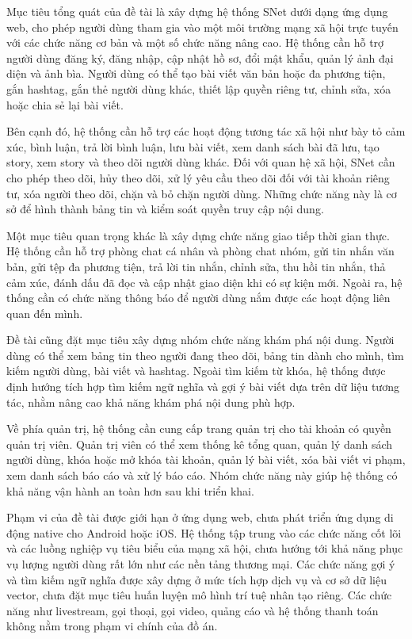 \documentclass[../DoAn.tex]{subfiles}
\begin{document}
Mục tiêu tổng quát của đề tài là xây dựng hệ thống SNet dưới dạng ứng dụng web, cho phép người dùng tham gia vào một môi trường mạng xã hội trực tuyến với các chức năng cơ bản và một số chức năng nâng cao. Hệ thống cần hỗ trợ người dùng đăng ký, đăng nhập, cập nhật hồ sơ, đổi mật khẩu, quản lý ảnh đại diện và ảnh bìa. Người dùng có thể tạo bài viết văn bản hoặc đa phương tiện, gắn hashtag, gắn thẻ người dùng khác, thiết lập quyền riêng tư, chỉnh sửa, xóa hoặc chia sẻ lại bài viết.

Bên cạnh đó, hệ thống cần hỗ trợ các hoạt động tương tác xã hội như bày tỏ cảm xúc, bình luận, trả lời bình luận, lưu bài viết, xem danh sách bài đã lưu, tạo story, xem story và theo dõi người dùng khác. Đối với quan hệ xã hội, SNet cần cho phép theo dõi, hủy theo dõi, xử lý yêu cầu theo dõi đối với tài khoản riêng tư, xóa người theo dõi, chặn và bỏ chặn người dùng. Những chức năng này là cơ sở để hình thành bảng tin và kiểm soát quyền truy cập nội dung.

Một mục tiêu quan trọng khác là xây dựng chức năng giao tiếp thời gian thực. Hệ thống cần hỗ trợ phòng chat cá nhân và phòng chat nhóm, gửi tin nhắn văn bản, gửi tệp đa phương tiện, trả lời tin nhắn, chỉnh sửa, thu hồi tin nhắn, thả cảm xúc, đánh dấu đã đọc và cập nhật giao diện khi có sự kiện mới. Ngoài ra, hệ thống cần có chức năng thông báo để người dùng nắm được các hoạt động liên quan đến mình.

Đề tài cũng đặt mục tiêu xây dựng nhóm chức năng khám phá nội dung. Người dùng có thể xem bảng tin theo người đang theo dõi, bảng tin dành cho mình, tìm kiếm người dùng, bài viết và hashtag. Ngoài tìm kiếm từ khóa, hệ thống được định hướng tích hợp tìm kiếm ngữ nghĩa và gợi ý bài viết dựa trên dữ liệu tương tác, nhằm nâng cao khả năng khám phá nội dung phù hợp.

Về phía quản trị, hệ thống cần cung cấp trang quản trị cho tài khoản có quyền quản trị viên. Quản trị viên có thể xem thống kê tổng quan, quản lý danh sách người dùng, khóa hoặc mở khóa tài khoản, quản lý bài viết, xóa bài viết vi phạm, xem danh sách báo cáo và xử lý báo cáo. Nhóm chức năng này giúp hệ thống có khả năng vận hành an toàn hơn sau khi triển khai.

Phạm vi của đề tài được giới hạn ở ứng dụng web, chưa phát triển ứng dụng di động native cho Android hoặc iOS. Hệ thống tập trung vào các chức năng cốt lõi và các luồng nghiệp vụ tiêu biểu của mạng xã hội, chưa hướng tới khả năng phục vụ lượng người dùng rất lớn như các nền tảng thương mại. Các chức năng gợi ý và tìm kiếm ngữ nghĩa được xây dựng ở mức tích hợp dịch vụ và cơ sở dữ liệu vector, chưa đặt mục tiêu huấn luyện mô hình trí tuệ nhân tạo riêng. Các chức năng như livestream, gọi thoại, gọi video, quảng cáo và hệ thống thanh toán không nằm trong phạm vi chính của đồ án.
\end{document}
